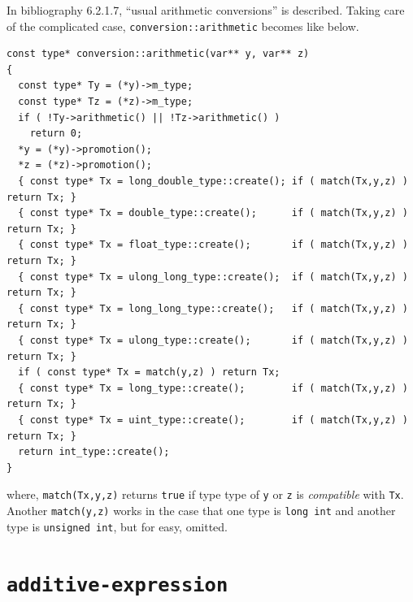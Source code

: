 In bibliography \cite{ISO} 6.2.1.7, ``usual arithmetic conversions''
is described. Taking care of the complicated case,
{\tt{conversion::arithmetic}} becomes like below.
\begin{verbatim}
const type* conversion::arithmetic(var** y, var** z)
{
  const type* Ty = (*y)->m_type;
  const type* Tz = (*z)->m_type;
  if ( !Ty->arithmetic() || !Tz->arithmetic() )
    return 0;
  *y = (*y)->promotion();
  *z = (*z)->promotion();
  { const type* Tx = long_double_type::create(); if ( match(Tx,y,z) ) return Tx; }
  { const type* Tx = double_type::create();      if ( match(Tx,y,z) ) return Tx; }
  { const type* Tx = float_type::create();       if ( match(Tx,y,z) ) return Tx; }
  { const type* Tx = ulong_long_type::create();  if ( match(Tx,y,z) ) return Tx; }
  { const type* Tx = long_long_type::create();   if ( match(Tx,y,z) ) return Tx; }
  { const type* Tx = ulong_type::create();       if ( match(Tx,y,z) ) return Tx; }
  if ( const type* Tx = match(y,z) ) return Tx;
  { const type* Tx = long_type::create();        if ( match(Tx,y,z) ) return Tx; }
  { const type* Tx = uint_type::create();        if ( match(Tx,y,z) ) return Tx; }
  return int_type::create();
}
\end{verbatim}
where, {\tt{match(Tx,y,z)}} returns {\tt{true}} if type type of
{\tt{y}} or {\tt{z}} is {\it compatible} with {\tt{Tx}}.
Another {\tt{match(y,z)}} works in the case
that one type is {\tt{long int}} and another type is {\tt{unsigned int}},
but for easy, omitted.

\section{\tt{additive-expression}}

